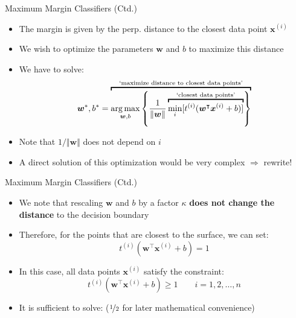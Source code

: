 \begin{frame}{Maximum Margin Classifiers (Ctd.)}{}
	\begin{itemize}
		\item The margin is given by the perp. distance to the closest data point $\bm{x}^{(i)}$
		\item We wish to optimize the parameters $\bm{w}$ and $b$ to maximize this distance
		\item We have to solve:
		\vspace*{-3.5mm}
		\begin{equation}
			\bm{w}^*, b^* =
			\overbracket{
				\argmax_{\bm{w}, b} \left\{ \frac{1}{\Vert \bm{w} \Vert}
				\overbracket{
					\min_i [t^{(i)} (\bm{w}^{\intercal} \bm{x}^{(i)} + b)]
				}^{\text{`closest data points'}}
				\right\}
			}^{\text{`maximize distance to closest data points'}}
		\end{equation}
		\vspace*{-3.5mm}
		\item Note that $1/\Vert \bm{w} \Vert$ does not depend on $i$
		\item A direct solution of this optimization would be very complex $\Rightarrow$ rewrite!
	\end{itemize}
\end{frame}


\begin{frame}{Maximum Margin Classifiers (Ctd.)}{}
	\begin{itemize}
		\item We note that rescaling $\bm{w}$ and $b$ by a factor $\kappa$
			\textbf{does not change the distance} to the decision boundary
		\item Therefore, for the points that are closest to the surface, we can set:
		\begin{equation}
			t^{(i)} (\bm{w}^{\intercal} \bm{x}^{(i)} + b) = 1
		\end{equation}
		\item In this case, all data points $\bm{x}^{(i)}$ satisfy the constraint:
		\begin{equation}
			t^{(i)} (\bm{w}^{\intercal} \bm{x}^{(i)} + b) \ge 1 \qquad i = 1, 2, \dots, n
		\end{equation}
		\item It is sufficient to solve: 
			\footnotesize ($\nicefrac{1}{2}$ for later mathematical convenience) \normalsize
	\end{itemize}
\end{frame}


